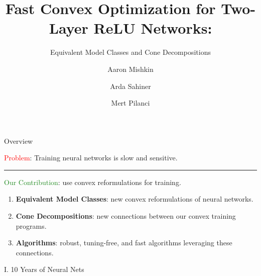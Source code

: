 \documentclass[usenames,dvipsnames,mathserif,notheorems]{beamer}
\title{Fast Convex Optimization for Two-Layer ReLU Networks:}
\subtitle{Equivalent Model Classes and Cone Decompositions}
\author{Aaron Mishkin \and Arda Sahiner \and Mert Pilanci}
\date{}
\newcommand{\horizontalrule}{
	{
			\vspace{-0.5em}
			\center \rule{\textwidth}{0.1em}
			\vspace{-0.2em}
		}
}
\newcommand{\red}[1]{\textcolor{Red}{#1}}
\newcommand{\green}[1]{\textcolor{ForestGreen}{#1}}
\begin{document}
\maketitle

\begin{frame}{Overview}

	{
		\large \red{Problem}: Training neural networks is slow and sensitive.
	}

	\pause
	\vspace{0.5em}
	\horizontalrule
	\vspace{0.5em}

	{
		\large \green{Our Contribution}: use convex reformulations for training.
	}

	\pause
	\vspace{0.5em}

	\begin{enumerate}
		\item \textbf{Equivalent Model Classes}: new convex reformulations of neural networks.\pause

		\item \textbf{Cone Decompositions}: new connections between our convex training programs.\pause

		\item \textbf{Algorithms}: robust, tuning-free, and fast algorithms leveraging these connections.
	\end{enumerate}

\end{frame}


\begin{frame}{}
	\begin{center}
		\huge I. 10 Years of Neural Nets
	\end{center}
\end{frame}
\end{document}
